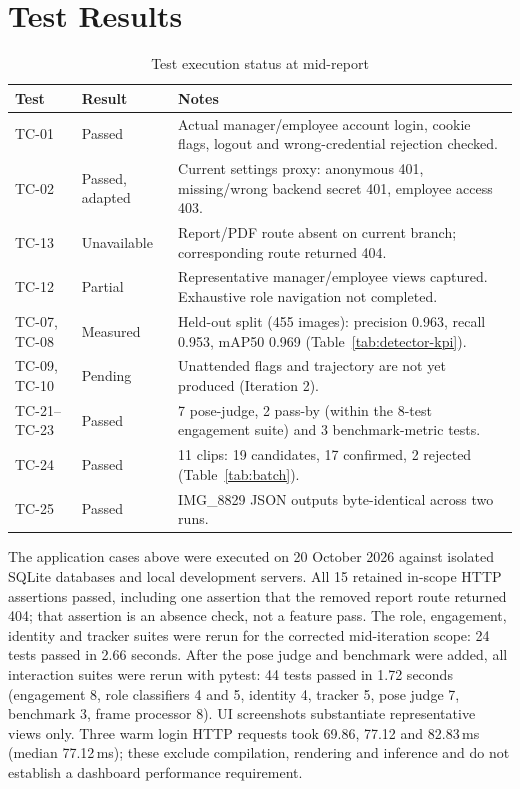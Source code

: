 \section{Test Results}
\begin{table}[H]
\centering
\caption{Test execution status at mid-report}
\begin{tabular}{P{0.12\textwidth}P{0.18\textwidth}P{0.5\textwidth}}
\toprule
Test & Result & Notes\\
\midrule
TC-01 & Passed & Actual manager/employee account login, cookie flags, logout and wrong-credential rejection checked.\\
TC-02 & Passed, adapted & Current settings proxy: anonymous 401, missing/wrong backend secret 401, employee access 403.\\
TC-13 & Unavailable & Report/PDF route absent on current branch; corresponding route returned 404.\\
TC-12 & Partial & Representative manager/employee views captured. Exhaustive role navigation not completed.\\
TC-07, TC-08 & Measured & Held-out split (455 images): precision 0.963, recall 0.953, mAP50 0.969 (Table~\ref{tab:detector-kpi}).\\
TC-09, TC-10 & Pending & Unattended flags and trajectory are not yet produced (Iteration 2).\\
TC-21--TC-23 & Passed & 7 pose-judge, 2 pass-by (within the 8-test engagement suite) and 3 benchmark-metric tests.\\
TC-24 & Passed & 11 clips: 19 candidates, 17 confirmed, 2 rejected (Table~\ref{tab:batch}).\\
TC-25 & Passed & IMG\_8829 JSON outputs byte-identical across two runs.\\
\bottomrule
\end{tabular}
\end{table}
The application cases above were executed on 20 October 2026 against isolated SQLite databases and local development servers. All 15 retained in-scope HTTP assertions passed, including one assertion that the removed report route returned 404; that assertion is an absence check, not a feature pass. The role, engagement, identity and tracker suites were rerun for the corrected mid-iteration scope: 24 tests passed in 2.66 seconds. After the pose judge and benchmark were added, all interaction suites were rerun with pytest: 44 tests passed in 1.72 seconds (engagement 8, role classifiers 4 and 5, identity 4, tracker 5, pose judge 7, benchmark 3, frame processor 8). UI screenshots substantiate representative views only. Three warm login HTTP requests took 69.86, 77.12 and 82.83\,ms (median 77.12\,ms); these exclude compilation, rendering and inference and do not establish a dashboard performance requirement.

